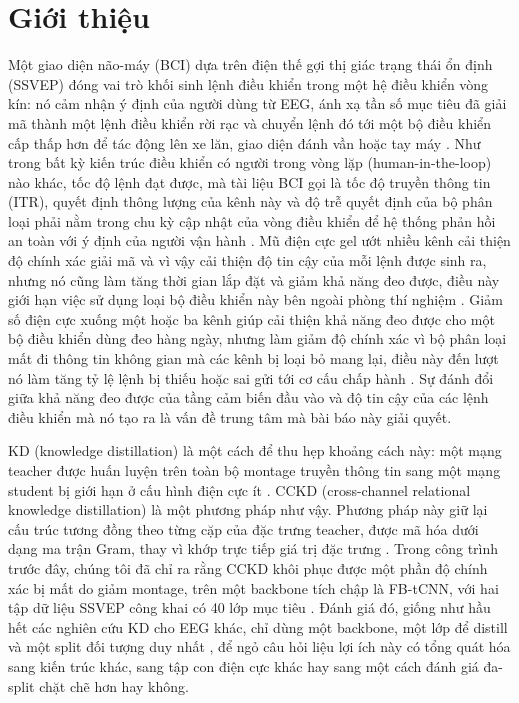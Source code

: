 \documentclass[11pt,a4paper,twoside,asymmetric]{article}
\begin{document}
\section{Giới thiệu}

Một giao diện não-máy (BCI) dựa trên điện thế gợi thị giác trạng thái ổn định (SSVEP) đóng vai trò khối sinh lệnh điều khiển trong một hệ điều khiển vòng kín: nó cảm nhận ý định của người dùng từ EEG, ánh xạ tần số mục tiêu đã giải mã thành một lệnh điều khiển rời rạc và chuyển lệnh đó tới một bộ điều khiển cấp thấp hơn để tác động lên xe lăn, giao diện đánh vần hoặc tay máy \cite{R3,R6,R7,R8,R9}. Như trong bất kỳ kiến trúc điều khiển có người trong vòng lặp (human-in-the-loop) nào khác, tốc độ lệnh đạt được, mà tài liệu BCI gọi là tốc độ truyền thông tin (ITR), quyết định thông lượng của kênh này và độ trễ quyết định của bộ phân loại phải nằm trong chu kỳ cập nhật của vòng điều khiển để hệ thống phản hồi an toàn với ý định của người vận hành \cite{R4,R5}. Mũ điện cực gel ướt nhiều kênh cải thiện độ chính xác giải mã và vì vậy cải thiện độ tin cậy của mỗi lệnh được sinh ra, nhưng nó cũng làm tăng thời gian lắp đặt và giảm khả năng đeo được, điều này giới hạn việc sử dụng loại bộ điều khiển này bên ngoài phòng thí nghiệm \cite{R39,R40,R41}. Giảm số điện cực xuống một hoặc ba kênh giúp cải thiện khả năng đeo được cho một bộ điều khiển dùng đeo hàng ngày, nhưng làm giảm độ chính xác vì bộ phân loại mất đi thông tin không gian mà các kênh bị loại bỏ mang lại, điều này đến lượt nó làm tăng tỷ lệ lệnh bị thiếu hoặc sai gửi tới cơ cấu chấp hành \cite{R36,R38}. Sự đánh đổi giữa khả năng đeo được của tầng cảm biến đầu vào và độ tin cậy của các lệnh điều khiển mà nó tạo ra là vấn đề trung tâm mà bài báo này giải quyết.

KD (knowledge distillation) là một cách để thu hẹp khoảng cách này: một mạng teacher được huấn luyện trên toàn bộ montage truyền thông tin sang một mạng student bị giới hạn ở cấu hình điện cực ít \cite{R47}. CCKD (cross-channel relational knowledge distillation) là một phương pháp như vậy. Phương pháp này giữ lại cấu trúc tương đồng theo từng cặp của đặc trưng teacher, được mã hóa dưới dạng ma trận Gram, thay vì khớp trực tiếp giá trị đặc trưng \cite{R82}. Trong công trình trước đây, chúng tôi đã chỉ ra rằng CCKD khôi phục được một phần độ chính xác bị mất do giảm montage, trên một backbone tích chập là FB-tCNN, với hai tập dữ liệu SSVEP công khai có 40 lớp mục tiêu \cite{R82,R16}. Đánh giá đó, giống như hầu hết các nghiên cứu KD cho EEG khác, chỉ dùng một backbone, một lớp để distill và một split đối tượng duy nhất \cite{R48,R49,R50,R51,R52,R53}, để ngỏ câu hỏi liệu lợi ích này có tổng quát hóa sang kiến trúc khác, sang tập con điện cực khác hay sang một cách đánh giá đa-split chặt chẽ hơn hay không.
\end{document}
